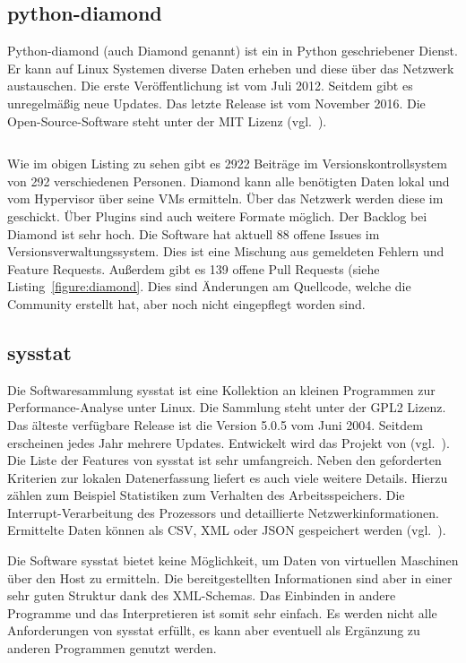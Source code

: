 \subsection{python-diamond}
Python-diamond (auch Diamond genannt) ist ein in Python geschriebener Dienst.
Er kann auf Linux Systemen diverse Daten erheben und diese über das Netzwerk
austauschen. Die erste Veröffentlichung ist vom Juli 2012. Seitdem gibt es
unregelmäßig neue Updates. Das letzte Release ist vom November 2016. Die
Open-Source-Software steht unter der MIT Lizenz (vgl.~\cite{python-diamond}).

\begin{center}
    \inputminted{text}{../listings/diamond-clone.txt}
\end{center}

Wie im obigen Listing zu sehen gibt es 2922 Beiträge im Versionskontrollsystem
von 292 verschiedenen Personen. Diamond kann alle benötigten Daten lokal und
vom Hypervisor über seine VMs ermitteln. Über das Netzwerk werden diese im
 geschickt. Über Plugins sind auch weitere
Formate möglich. Der \gls{Backlog} bei Diamond ist sehr hoch. Die Software hat
aktuell 88 offene Issues im Versionsverwaltungssystem. Dies ist eine Mischung
aus gemeldeten Fehlern und Feature Requests. Außerdem gibt es 139 offene Pull
Requests (siehe Listing~\ref{figure:diamond}. Dies sind Änderungen am
Quellcode, welche die Community erstellt hat, aber noch nicht eingepflegt
worden sind.
\tm%

\subsection{sysstat}
Die Softwaresammlung sysstat ist eine Kollektion an kleinen Programmen zur
Performance-Analyse unter Linux. Die Sammlung steht unter der GPL2 Lizenz. Das
älteste verfügbare Release ist die Version 5.0.5 vom Juni 2004. Seitdem
erscheinen jedes Jahr mehrere Updates. Entwickelt wird das Projekt
von (vgl.~\cite{systat_releases}). Die Liste der Features von sysstat ist sehr
umfangreich.  Neben den geforderten Kriterien zur lokalen Datenerfassung
liefert es auch viele weitere Details. Hierzu zählen zum Beispiel Statistiken
zum Verhalten des Arbeitsspeichers. Die Interrupt-Verarbeitung des Prozessors
und detaillierte Netzwerkinformationen. Ermittelte Daten können als \gls{CSV},
\gls{XML} oder \gls{JSON} gespeichert werden (vgl.~\cite{sysstat_features}).

Die Software sysstat bietet keine Möglichkeit, um Daten von virtuellen
Maschinen über den Host zu ermitteln. Die bereitgestellten Informationen sind
aber in einer sehr guten Struktur dank des XML-Schemas. Das Einbinden in andere
Programme und das Interpretieren ist somit sehr einfach. Es werden nicht alle
Anforderungen von sysstat erfüllt, es kann aber eventuell als Ergänzung zu
anderen Programmen genutzt werden.
\tm%

